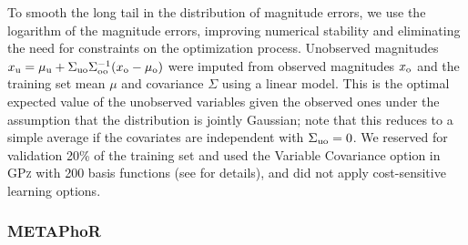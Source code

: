 To smooth the long tail in the distribution of magnitude errors, we use the logarithm of the magnitude errors, improving numerical stability and eliminating the need for constraints on the optimization process.
Unobserved magnitudes $x_{\rm u} = \mu_{\rm u} + \Sigma_{\rm uo}\Sigma_{\rm oo}^{-1}(x_{\rm o} - \mu_{\rm o})$ were imputed from observed magnitudes $x_{\rm o}$ and the training set mean $\mu$ and covariance $\Sigma$ using a linear model.
This is the optimal expected value of the unobserved variables given the observed ones under the assumption that the distribution is jointly Gaussian; note that this reduces to a simple average if the covariates are independent with $\Sigma_{\rm uo} = 0$.
We reserved for validation 20\% of the training set and used the Variable Covariance option in \textsc{GPz} with 200 basis functions (see \citet{almosallam_gpz:_2016} for details), and did not apply cost-sensitive learning options.

\subsubsection{METAPhoR}

